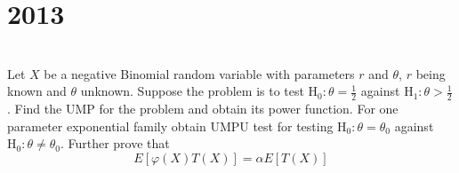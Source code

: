 \section*{2013}
\vspace{-.5cm}
\hrulefill \smallskip\\
 Let $X$ be a negative Binomial random variable with parameters $r$ and $\theta$, $r$ being known and $\theta$ unknown. Suppose the problem is to test $\text{H}_0 : \theta = \frac{1}{2}$ against $\text{H}_1 : \theta > \frac{1}{2}$. Find the UMP for the problem and obtain its power function.
\myline
{} For one parameter exponential family obtain UMPU test for testing $\text{H}_0 : \theta = \theta_0$ against $\text{H}_0 : \theta \neq \theta_0$. Further prove that \[ E\left[\varphi(X)T(X)\right] = \alpha E\left[T(X)\right] \]